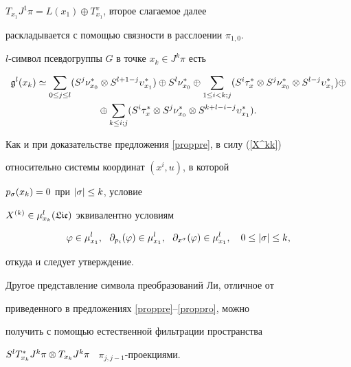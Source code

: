 $T_{x_1}J^1\pi=L(x_1)\oplus T^v_{x_1}$, второе слагаемое далее


раскладывается с помощью связности в расслоении $\pi_{1,0}$.





\begin{prop}\label{proppro}


$l$-символ псевдогруппы $G$ в точке $x_k\in J^k\pi$ есть


\begin{multline*}


\g^l(x_k)\simeq \sum_{0\le j\le l}(S^j\nu_{x_0}^*\ot


S^{l+1-j}\ups_{x_1}^*)\oplus S^l\nu_{x_0}^*\oplus\sum_{1\le


i<k;j}(S^i\tau_x^*\ot S^j\nu_{x_0}^*\ot S^{l-j}\ups_{x_1}^*)\oplus\\


\oplus \sum_{k\le i;j}(S^i\tau_x^*\ot S^j\nu_{x_0}^*\ot


S^{k+l-i-j}\ups_{x_1}^*).


\end{multline*}


\end{prop}





\begin{pf}


Как и при доказательстве предложения \ref{proppre}, в силу (\ref{X^kk})


относительно системы координат $(x^i,u)$, в которой


$p_\sigma(x_k)=0$ при $|\sigma|\le k$, условие


$X^{(k)}\in\mu^l_{x_k}(\frak{Lie})$ эквивалентно условиям


$$


\vp\in\mu^l_{x_1},\ \ \p_{p_i}(\vp)\in\mu^l_{x_1},\ \


\p_{x^\z}(\vp)\in\mu^l_{x_1},\quad 0\le|\z|\le k,


$$


откуда и следует утверждение.


\end{pf}





\begin{note}


Другое представление символа преобразований Ли, отличное от


приведенного в предложениях \ref{proppre}--\ref{proppro}, можно


получить с помощью естественной фильтрации пространства


$S^lT^*_{x_k}J^k\pi\otimes T_{x_k}J^k\pi$ \ $\pi_{j,j-1}$-проекциями.


\end{note}








